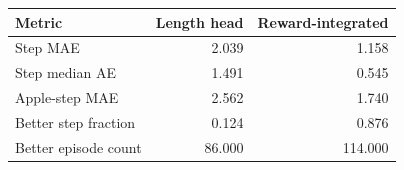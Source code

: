 \begin{tabular}{lrr}
\toprule
Metric & Length head & Reward-integrated \\
\midrule
Step MAE & 2.039 & 1.158 \\
Step median AE & 1.491 & 0.545 \\
Apple-step MAE & 2.562 & 1.740 \\
Better step fraction & 0.124 & 0.876 \\
Better episode count & 86.000 & 114.000 \\
\bottomrule
\end{tabular}
